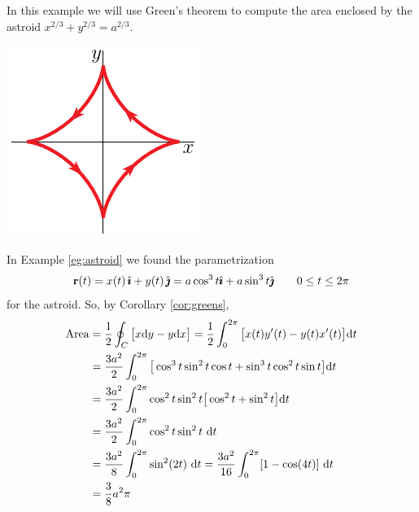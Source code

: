 \begin{eg}\label{eg:greenB}
In this example we will use Green's theorem to compute the area enclosed
by the astroid $x^{2/3} + y^{2/3} = a^{2/3}$.
\begin{nfig}
\begin{center}
    \includegraphics{astroid6.pdf}
\end{center}
\end{nfig}
In Example \ref{eg:astroid} we found the parametrization
\begin{equation*}
\mathbf{r}(t) = x(t)\,\hat{\pmb{\imath}} + y(t)\,\hat{\pmb{\jmath}} = a\cos^3t\hat{\pmb{\imath}} + a\sin^3 t\hat{\pmb{\jmath}}
\qquad 0\le t\le 2\pi
\end{equation*}
for the astroid. So, by Corollary \ref{cor:greens},
\begin{align*}
\text{Area}
&=\frac{1}{2}\oint_C \big[x\mathrm{d}y -y\mathrm{d}x\big]
 =\frac{1}{2}\int_0^{2\pi} \big[x(t)y'(t) -y(t)x'(t)\big]\mathrm{d}t \\
&=\frac{3a^2}{2}\int_0^{2\pi} \big[\cos^3t\sin^2t\cos t 
                                 +\sin^3t\cos^2 t\sin t\big]\mathrm{d}t \\
&=\frac{3a^2}{2}\int_0^{2\pi} \cos^2t\sin^2t\big[\cos^2t 
                                 +\sin^2t\big]\mathrm{d}t \\
&=\frac{3a^2}{2}\int_0^{2\pi} \cos^2t\sin^2t\ \mathrm{d}t \\
&=\frac{3a^2}{8}\int_0^{2\pi} \sin^2(2t)\ \mathrm{d}t 
=\frac{3a^2}{16}\int_0^{2\pi} [1-\cos(4t)]\ \mathrm{d}t \\
&=\frac{3}{8}a^2\pi
\end{align*}
\end{eg}

